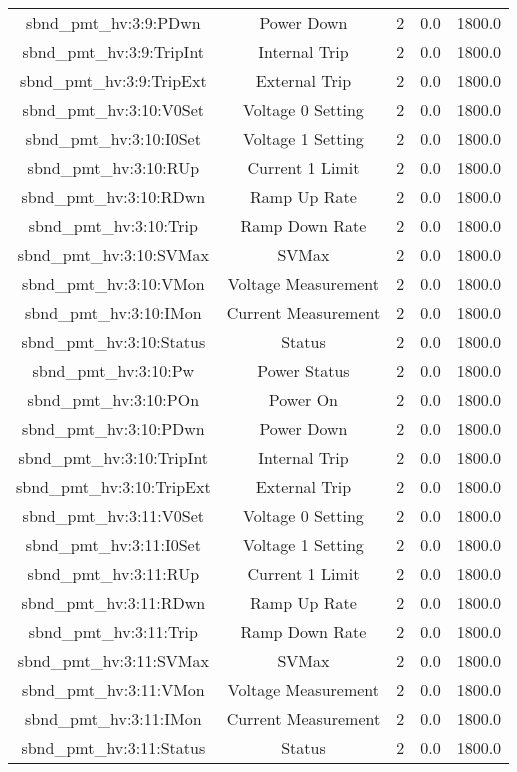 \begin{table}[ptb]
\begin{tabular}{c | c c c c}
sbnd_pmt_hv:3:9:PDwn & Power Down & 2 & 0.0 & 1800.0\\ 
sbnd_pmt_hv:3:9:TripInt & Internal Trip & 2 & 0.0 & 1800.0\\ 
sbnd_pmt_hv:3:9:TripExt & External Trip & 2 & 0.0 & 1800.0\\ 
sbnd_pmt_hv:3:10:V0Set & Voltage 0 Setting & 2 & 0.0 & 1800.0\\ 
sbnd_pmt_hv:3:10:I0Set & Voltage 1 Setting & 2 & 0.0 & 1800.0\\ 
sbnd_pmt_hv:3:10:RUp & Current 1 Limit & 2 & 0.0 & 1800.0\\ 
sbnd_pmt_hv:3:10:RDwn & Ramp Up Rate & 2 & 0.0 & 1800.0\\ 
sbnd_pmt_hv:3:10:Trip & Ramp Down Rate & 2 & 0.0 & 1800.0\\ 
sbnd_pmt_hv:3:10:SVMax & SVMax & 2 & 0.0 & 1800.0\\ 
sbnd_pmt_hv:3:10:VMon & Voltage Measurement & 2 & 0.0 & 1800.0\\ 
sbnd_pmt_hv:3:10:IMon & Current Measurement & 2 & 0.0 & 1800.0\\ 
sbnd_pmt_hv:3:10:Status & Status & 2 & 0.0 & 1800.0\\ 
sbnd_pmt_hv:3:10:Pw & Power Status & 2 & 0.0 & 1800.0\\ 
sbnd_pmt_hv:3:10:POn & Power On & 2 & 0.0 & 1800.0\\ 
sbnd_pmt_hv:3:10:PDwn & Power Down & 2 & 0.0 & 1800.0\\ 
sbnd_pmt_hv:3:10:TripInt & Internal Trip & 2 & 0.0 & 1800.0\\ 
sbnd_pmt_hv:3:10:TripExt & External Trip & 2 & 0.0 & 1800.0\\ 
sbnd_pmt_hv:3:11:V0Set & Voltage 0 Setting & 2 & 0.0 & 1800.0\\ 
sbnd_pmt_hv:3:11:I0Set & Voltage 1 Setting & 2 & 0.0 & 1800.0\\ 
sbnd_pmt_hv:3:11:RUp & Current 1 Limit & 2 & 0.0 & 1800.0\\ 
sbnd_pmt_hv:3:11:RDwn & Ramp Up Rate & 2 & 0.0 & 1800.0\\ 
sbnd_pmt_hv:3:11:Trip & Ramp Down Rate & 2 & 0.0 & 1800.0\\ 
sbnd_pmt_hv:3:11:SVMax & SVMax & 2 & 0.0 & 1800.0\\ 
sbnd_pmt_hv:3:11:VMon & Voltage Measurement & 2 & 0.0 & 1800.0\\ 
sbnd_pmt_hv:3:11:IMon & Current Measurement & 2 & 0.0 & 1800.0\\ 
sbnd_pmt_hv:3:11:Status & Status & 2 & 0.0 & 1800.0\\ 

\end{tabular}
\end{table}
